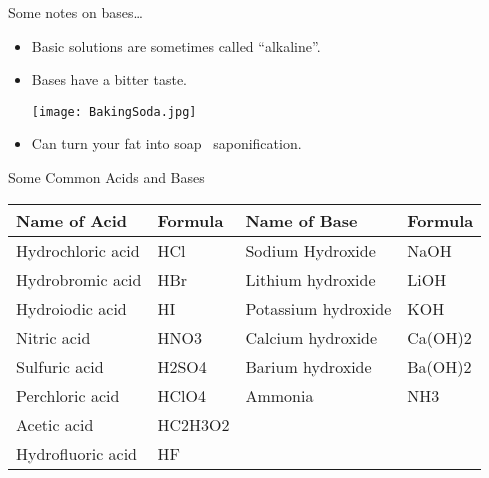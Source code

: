 \documentclass[11pt,letterpaper]{article}
\begin{document}
\begin{frame}{Some notes on bases\ldots}
	\begin{itemize}[<+->]
		\item Basic solutions are sometimes called ``alkaline''.

			\bigskip

		\item Bases have a bitter taste.\hfill
			\parbox{0.5\linewidth}{
				\centering
				\texttt{[image: BakingSoda.jpg]}
				}

			\bigskip

		\item Can turn your fat into soap \textrightarrow\
			\alert{saponification}.
	\end{itemize}
\end{frame}

\begin{frame}{Some Common Acids and Bases}
	\begin{center}
		\small
	\begin{tabular} {l E@{\qquad}l E}
		\toprule
		\bfseries Name of Acid & \bfseries Formula & \bfseries Name of
		Base & \bfseries Formula \\ \midrule
		Hydrochloric acid & HCl & Sodium Hydroxide & NaOH \\
		Hydrobromic acid & HBr & Lithium hydroxide & LiOH \\
		Hydroiodic acid & HI & Potassium hydroxide & KOH \\
		Nitric acid & HNO3 & Calcium hydroxide & Ca(OH)2 \\
		Sulfuric acid & H2SO4 & Barium hydroxide & Ba(OH)2 \\
		Perchloric acid & HClO4 & Ammonia & NH3 \\
		Acetic acid & HC2H3O2 \\
		Hydrofluoric acid & HF \\ \bottomrule
	\end{tabular}
\end{center}
\end{frame}
\end{document}
